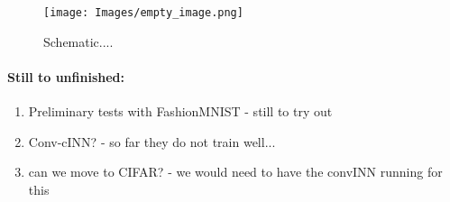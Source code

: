             \begin{figure}
                \vskip -0.2in 
                \centering
    
                \texttt{[image: Images/empty\_image.png]} 
                
                \vspace{-2pt}
                \caption{\label{fig:exp_stle_3} Schematic.... }
                \vskip -0.0in 
            \end{figure}

        
            \paragraph{Still to unfinished:}
                \begin{enumerate}
                    \item Preliminary tests with FashionMNIST - still to try out
                    \item Conv-cINN? - so far they do not train well...
                    \item can we move to CIFAR? - we would need to have the convINN running for this
                \end{enumerate}
